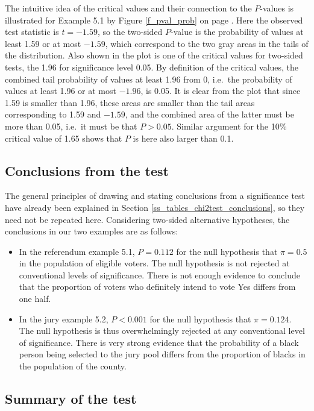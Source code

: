 The intuitive idea of the critical values and their connection to the
$P$-values is illustrated for Example 5.1 by Figure \ref{f_pval_prob} on
page \pageref{f_pval_prob}. Here the observed test statistic is
$t=-1.59$, so the two-sided $P$-value is the probability of values at
least 1.59 or at most $-1.59$, which correspond to the two gray areas in the
tails of the distribution. Also shown in the plot is one of the critical
values for two-sided tests, the 1.96 for significance level 0.05. By
definition of the critical values, the combined tail probability of
values at least 1.96 from 0, i.e.\ the probability of values at least
1.96 or at most $-1.96$, is 0.05. It is clear from the plot that since
1.59 is smaller than 1.96, these areas are smaller than the tail areas
corresponding to 1.59 and $-1.59$, and the combined area of the latter
must be more than 0.05, i.e.\ it must be that $P>0.05$. Similar argument
for the 10\% critical value of 1.65 shows that $P$ is here also larger
than 0.1.

\subsection{Conclusions from the test}
\label{ss_probs_test1sample_conclusions}

The general principles of drawing and stating conclusions from a
significance test have already been explained in Section
\ref{ss_tables_chi2test_conclusions}, so they need not be repeated here.
Considering two-sided alternative hypotheses, the conclusions in our
two examples are as follows:
\begin{itemize}
\item
In the referendum example 5.1, $P=0.112$ for the null hypothesis that
$\pi=0.5$ in the population of eligible voters. The null hypothesis is
not rejected at conventional levels of significance. There is not enough
evidence to conclude that the proportion of voters who definitely intend
to vote Yes differs from one half.
\item
In the jury example 5.2, $P<0.001$ for the null hypothesis that
$\pi=0.124$. The null hypothesis is thus overwhelmingly rejected at any
conventional level of significance. There is very strong evidence that
the probability of a black person being selected to the jury pool
differs from the proportion of blacks in the population of the county.
\end{itemize}

\subsection{Summary of the test}
\label{ss_probs_test1sample_summary}

